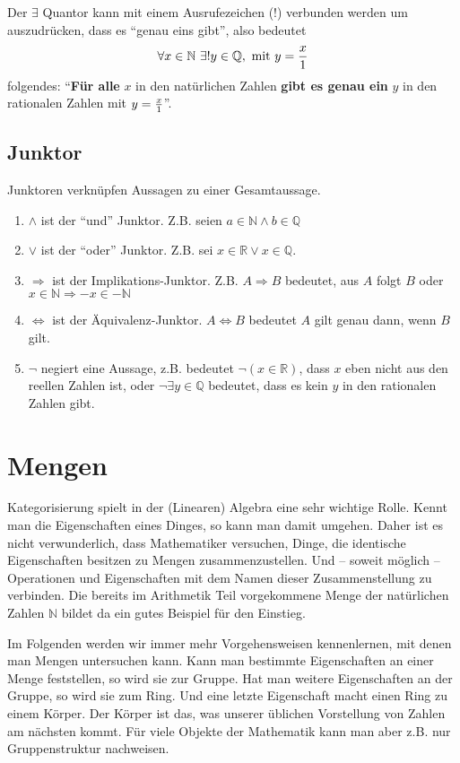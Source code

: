Der $\exists$ Quantor kann mit einem Ausrufezeichen (!) verbunden werden um auszudrücken, dass es "`genau eins gibt"', also bedeutet
\[ \forall x\in \mathbb{N}\ \exists! y\in \mathbb{Q},\text{ mit }  y={x\over 1} \]
folgendes: "`\textbf{Für alle} $x$ in den natürlichen Zahlen \textbf{gibt es genau ein} $y$ in den rationalen Zahlen mit $y={x \over 1}$"'.

\subsection{Junktor}

Junktoren verknüpfen Aussagen zu einer Gesamtaussage.

\begin{enumerate}
\item $\wedge $ ist der "`und"' Junktor. Z.B. seien $a\in \mathbb{N} \wedge b\in \mathbb{Q} $
\item $\vee$ ist der "`oder"' Junktor. Z.B. sei $x\in \mathbb{R} \vee x\in \mathbb{Q}$.
\item $\Rightarrow$ ist der Implikations-Junktor. Z.B. $A\Rightarrow B$ bedeutet, aus $A$ folgt $B$ oder $x\in \mathbb{N} \Rightarrow -x \in -\mathbb{N}$
\item $\Leftrightarrow$ ist der Äquivalenz-Junktor. $A\Leftrightarrow B$ bedeutet $A$ gilt genau dann, wenn $B$ gilt.
\item $\neg$ negiert eine Aussage, z.B. bedeutet $\neg(x\in \mathbb{R})$, dass $x$ eben nicht aus den reellen Zahlen ist, oder $\neg \exists y\in \mathbb{Q}$ bedeutet, dass es kein $y$ in den rationalen Zahlen gibt.
\end{enumerate}


\section{Mengen}

Kategorisierung spielt in der (Linearen) Algebra eine sehr wichtige Rolle. Kennt man die Eigenschaften eines Dinges, so kann man damit umgehen. Daher ist es nicht verwunderlich, dass Mathematiker versuchen, Dinge, die identische Eigenschaften besitzen zu Mengen zusammenzustellen. Und -- soweit möglich -- Operationen und Eigenschaften mit dem Namen dieser Zusammenstellung zu verbinden. Die bereits im Arithmetik Teil vorgekommene Menge der natürlichen Zahlen $\mathbb{N}$ bildet da ein gutes Beispiel für den Einstieg. 

Im Folgenden werden wir immer mehr Vorgehensweisen kennenlernen, mit denen man Mengen untersuchen kann. Kann man bestimmte Eigenschaften an einer Menge feststellen, so wird sie zur Gruppe. Hat man weitere Eigenschaften an der Gruppe, so wird sie zum Ring. Und eine letzte Eigenschaft macht einen Ring zu einem Körper. Der Körper ist das, was unserer üblichen Vorstellung von Zahlen am nächsten kommt. Für viele Objekte der Mathematik kann man aber z.B. nur Gruppenstruktur nachweisen. 

